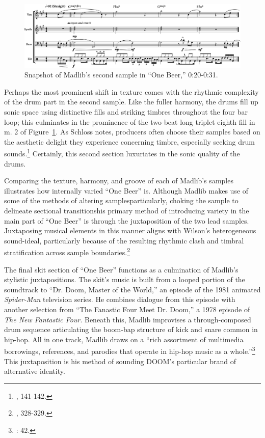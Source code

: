     \begin{figure}[ht]
        \centering
        \includegraphics[width=\textwidth]{images/figures/chp 02/020031onebeermain.pdf}
        \caption{Snapshot of Madlib's second sample in ``One Beer,'' 0:20-0:31.}
        \label{fig:onebeermain}
    \end{figure}

Perhaps the most prominent shift in texture comes with the rhythmic complexity of the drum part in the second sample. Like the fuller harmony, the drums fill up sonic space using distinctive fills and striking timbres throughout the four bar loop; this culminates in the prominence of the two-beat long triplet eighth fill in m. 2 of Figure~\ref{fig:onebeermain}. As Schloss notes, producers often choose their samples based on the aesthetic delight they experience concerning timbre, especially seeking drum sounds.\footnote{\cite{josephgschlossMakingBeatsArt2004}, 141-142.} Certainly, this second section luxuriates in the sonic quality of the drums.

Comparing the texture, harmony, and groove of each of Madlib's samples illustrates how internally varied ``One Beer'' is. Although Madlib makes use of some of the methods of altering samples\textemdash particularly, choking the sample to delineate sectional transitions\textemdash his primary method of introducing variety in the main part of ``One Beer'' is through the juxtaposition of the two lead samples. Juxtaposing musical elements in this manner aligns with Wilson's heterogeneous sound-ideal, particularly because of the resulting rhythmic clash and  timbral stratification across sample boundaries.\footnote{\cite{ollywilsonHeterogeneousSoundIdeal1992}, 328-329.}

The final skit section of ``One Beer'' functions as a culmination of Madlib's stylistic juxtapositions. The skit's music is built from a looped portion of the soundtrack to ``Dr. Doom, Master of the World,'' an episode of the 1981 animated \textit{Spider-Man} television series. He combines dialogue from this episode with another selection from ``The Fanastic Four Meet Dr. Doom,'' a 1978 episode of \textit{The New Fantastic Four}. Beneath this, Madlib improvises a through-composed drum sequence articulating the boom-bap structure of kick and snare common in hip-hop. All in one track, Madlib draws on a ``rich assortment of multimedia borrowings, references, and parodies that operate in hip-hop music as a whole.''\footnote{\cite{joannademersSampling1970sHipHop2003}: 42.} This juxtaposition is his method of sounding DOOM's particular brand of alternative identity.


